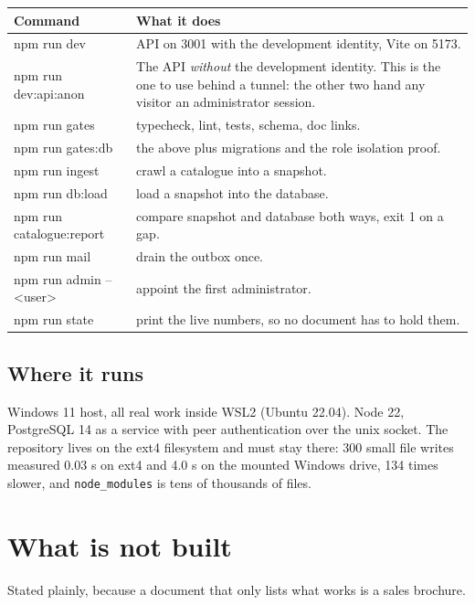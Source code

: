\documentclass[11pt,a4paper]{article}
\begin{document}
\begin{center}
\sffamily\small
\begin{tabular}{@{}>{\ttfamily}l p{9.6cm}@{}}
\toprule
\textrm{\textbf{Command}} & \textrm{\textbf{What it does}} \\
\midrule
npm run dev & API on 3001 with the development identity, Vite on 5173. \\
npm run dev:api:anon & The API \emph{without} the development identity. This is
  the one to use behind a tunnel: the other two hand any visitor an
  administrator session. \\
npm run gates & typecheck, lint, tests, schema, doc links. \\
npm run gates:db & the above plus migrations and the role isolation proof. \\
npm run ingest & crawl a catalogue into a snapshot. \\
npm run db:load & load a snapshot into the database. \\
npm run catalogue:report & compare snapshot and database both ways, exit 1 on a gap. \\
npm run mail & drain the outbox once. \\
npm run admin -- <user> & appoint the first administrator. \\
npm run state & print the live numbers, so no document has to hold them. \\
\bottomrule
\end{tabular}
\end{center}

\subsection{Where it runs}

Windows 11 host, all real work inside WSL2 (Ubuntu 22.04). Node 22, PostgreSQL
14 as a service with peer authentication over the unix socket. The repository
lives on the ext4 filesystem and must stay there: 300 small file writes
measured 0.03 s on ext4 and 4.0 s on the mounted Windows drive, 134 times
slower, and \texttt{node\_modules} is tens of thousands of files.

\section{What is not built}

Stated plainly, because a document that only lists what works is a sales
brochure.
\end{document}
